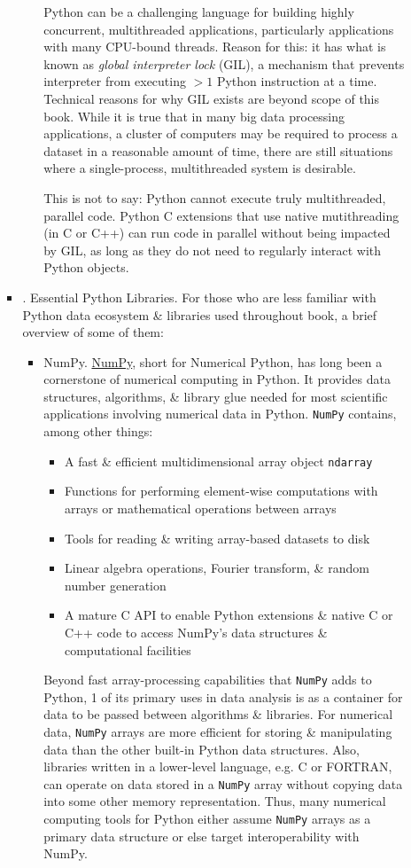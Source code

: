\documentclass{article}
\begin{document}
\begin{enumerate}
\begin{itemize}
\begin{itemize}
\begin{itemize}
				Python can be a challenging language for building highly concurrent, multithreaded applications, particularly applications with many CPU-bound threads. Reason for this: it has what is known as {\it global interpreter lock} (GIL), a mechanism that prevents interpreter from executing $> 1$ Python instruction at a time. Technical reasons for why GIL exists are beyond scope of this book. While it is true that in many big data processing applications, a cluster of computers may be required to process a dataset in a reasonable amount of time, there are still situations where a single-process, multithreaded system is desirable.
				
				This is not to say: Python cannot execute truly multithreaded, parallel code. Python C extensions that use native mutithreading (in C or C++) can run code in parallel without being impacted by GIL, as long as they do not need to regularly interact with Python objects.
			\end{itemize}
			\item {. Essential Python Libraries.} For those who are less familiar with Python data ecosystem \& libraries used throughout book, a brief overview of some of them:
			\begin{itemize}
				\item {\sf NumPy.} \href{https://numpy.org}{NumPy}, short for Numerical Python, has long been a cornerstone of numerical computing in Python. It provides data structures, algorithms, \& library glue needed for most scientific applications involving numerical data in Python. {\tt NumPy} contains, among other things:
				\begin{itemize}
					\item A fast \& efficient multidimensional array object {\tt ndarray}
					\item Functions for performing element-wise computations with arrays or mathematical operations between arrays
					\item Tools for reading \& writing array-based datasets to disk
					\item Linear algebra operations, Fourier transform, \& random number generation
					\item A mature C API to enable Python extensions \& native C or C++ code to access NumPy's data structures \& computational facilities
				\end{itemize}
				Beyond fast array-processing capabilities that {\tt NumPy} adds to Python, 1 of its primary uses in data analysis is as a container for data to be passed between algorithms \& libraries. For numerical data, {\tt NumPy} arrays are more efficient for storing \& manipulating data than the other built-in Python data structures. Also, libraries written in a lower-level language, e.g. C or FORTRAN, can operate on data stored in a {\tt NumPy} array without copying data into some other memory representation. Thus, many numerical computing tools for Python either assume {\tt NumPy} arrays as a primary data structure or else target interoperability with NumPy.

\end{itemize}
\end{itemize}
\end{itemize}
\end{enumerate}
\end{document}
